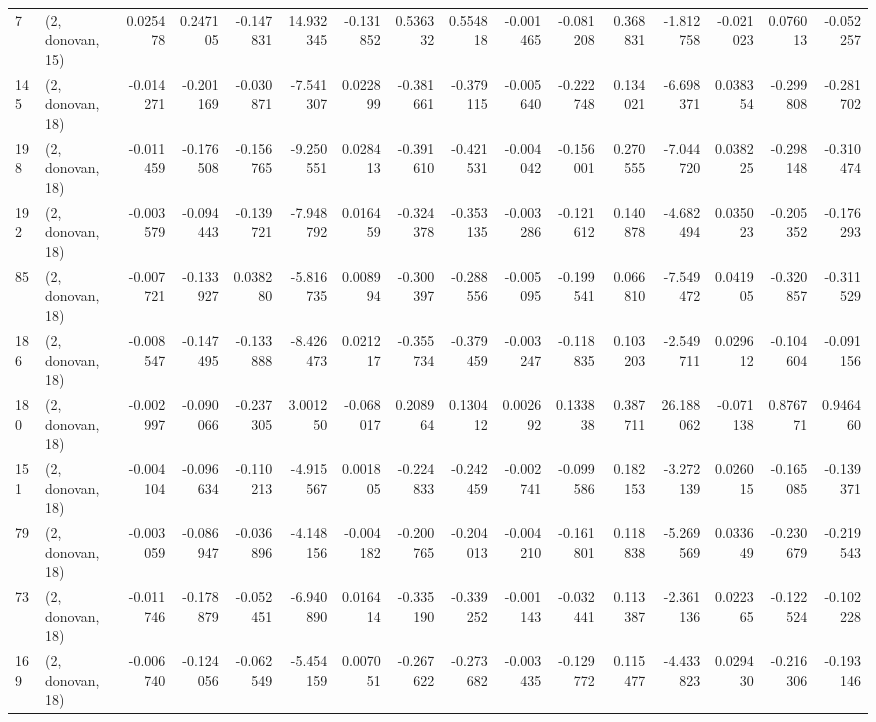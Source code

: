 \begin{tabular}{llrrrrrrrrrrrrrr}
7   &  (2, donovan, 15) &   0.025478 &  0.247105 & -0.147831 &   14.932345 & -0.131852 &   0.536332 &  0.554818 & -0.001465 & -0.081208 &  0.368831 &   -1.812758 & -0.021023 &  0.076013 & -0.052257 \\
145 &  (2, donovan, 18) &  -0.014271 & -0.201169 & -0.030871 &   -7.541307 &  0.022899 &  -0.381661 & -0.379115 & -0.005640 & -0.222748 &  0.134021 &   -6.698371 &  0.038354 & -0.299808 & -0.281702 \\
198 &  (2, donovan, 18) &  -0.011459 & -0.176508 & -0.156765 &   -9.250551 &  0.028413 &  -0.391610 & -0.421531 & -0.004042 & -0.156001 &  0.270555 &   -7.044720 &  0.038225 & -0.298148 & -0.310474 \\
192 &  (2, donovan, 18) &  -0.003579 & -0.094443 & -0.139721 &   -7.948792 &  0.016459 &  -0.324378 & -0.353135 & -0.003286 & -0.121612 &  0.140878 &   -4.682494 &  0.035023 & -0.205352 & -0.176293 \\
85  &  (2, donovan, 18) &  -0.007721 & -0.133927 &  0.038280 &   -5.816735 &  0.008994 &  -0.300397 & -0.288556 & -0.005095 & -0.199541 &  0.066810 &   -7.549472 &  0.041905 & -0.320857 & -0.311529 \\
186 &  (2, donovan, 18) &  -0.008547 & -0.147495 & -0.133888 &   -8.426473 &  0.021217 &  -0.355734 & -0.379459 & -0.003247 & -0.118835 &  0.103203 &   -2.549711 &  0.029612 & -0.104604 & -0.091156 \\
180 &  (2, donovan, 18) &  -0.002997 & -0.090066 & -0.237305 &    3.001250 & -0.068017 &   0.208964 &  0.130412 &  0.002692 &  0.133838 &  0.387711 &   26.188062 & -0.071138 &  0.876771 &  0.946460 \\
151 &  (2, donovan, 18) &  -0.004104 & -0.096634 & -0.110213 &   -4.915567 &  0.001805 &  -0.224833 & -0.242459 & -0.002741 & -0.099586 &  0.182153 &   -3.272139 &  0.026015 & -0.165085 & -0.139371 \\
79  &  (2, donovan, 18) &  -0.003059 & -0.086947 & -0.036896 &   -4.148156 & -0.004182 &  -0.200765 & -0.204013 & -0.004210 & -0.161801 &  0.118838 &   -5.269569 &  0.033649 & -0.230679 & -0.219543 \\
73  &  (2, donovan, 18) &  -0.011746 & -0.178879 & -0.052451 &   -6.940890 &  0.016414 &  -0.335190 & -0.339252 & -0.001143 & -0.032441 &  0.113387 &   -2.361136 &  0.022365 & -0.122524 & -0.102228 \\
169 &  (2, donovan, 18) &  -0.006740 & -0.124056 & -0.062549 &   -5.454159 &  0.007051 &  -0.267622 & -0.273682 & -0.003435 & -0.129772 &  0.115477 &   -4.433823 &  0.029430 & -0.216306 & -0.193146 \\

\end{tabular}
